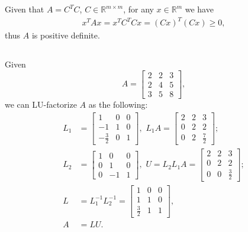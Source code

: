 \documentclass[11pt]{article}
\begin{document}
\section{}
\subsection{}
Given that $A = C^TC$, $C\in\mathbb{R}^{m\times m}$, for any $x\in\mathbb{R}^m$ we have 
\begin{equation}\begin{split} 
x^TAx = x^TC^TCx = (Cx)^T(Cx)\geq0,
\end{split}\nonumber\end{equation}
thus $A$ is positive definite. 
\subsection{}
Given $$A = \begin{bmatrix} 2 & 2 & 3 \\ 2 & 4 & 5 \\ 3 & 5 & 8\end{bmatrix}, $$
we can LU-factorize $A$ as the following:
\begin{equation}\begin{split} 
L_1 &= \begin{bmatrix} 1 & 0& 0\\ -1 & 1 &0 \\ -\frac32 & 0 & 1\end{bmatrix},\,\,
L_1A = \begin{bmatrix}2 & 2 & 3 \\ 0 & 2 & 2\\ 0 & 2 & \frac72 \end{bmatrix};\\
L_2 &= \begin{bmatrix} 1 & 0 & 0 \\ 0 & 1 & 0\\ 0 & -1 &1 \end{bmatrix},\,\,
U = L_2L_1A = \begin{bmatrix} 2 & 2 & 3 \\ 0 & 2 & 2 \\ 0 & 0 & \frac32 \end{bmatrix};\\
L &= L_1^{-1}L_2^{-1} = \begin{bmatrix}1 & 0 & 0 \\ 1 & 1 & 0 \\ \frac32 & 1 & 1 \end{bmatrix},\\
A &= LU.
\end{split}\nonumber\end{equation} 
\end{document}
